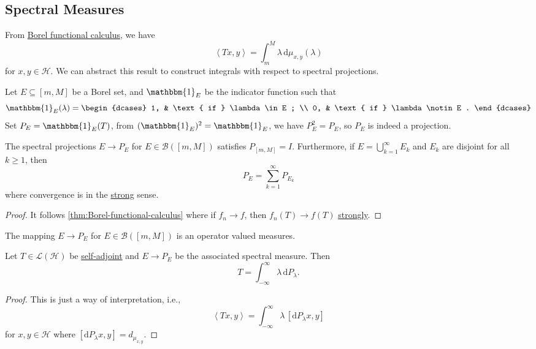 \subsection{Spectral Measures}
From \hyperref[thm:Borel-functional-calculus]{Borel functional calculus}, we have
\[
	\left\langle Tx, y \right\rangle = \int_{m}^{M} \lambda  \,\mathrm{d}\mu _{x, y}(\lambda )
\]
for \(x, y\in \mathcal{H} \). We can abstract this result to construct integrals with respect to spectral projections.

Let \(E \subseteq [m, M]\) be a Borel set, and \(\mathbbm{1}_{E} \) be the indicator function such that
\[
	\mathbbm{1}_{E} (\lambda ) = \begin{dcases}
		1, & \text{ if } \lambda \in E ;    \\
		0, & \text{ if } \lambda \notin E .
	\end{dcases}
\]
Set \(P_E = \mathbbm{1}_{E}(T) \), from \((\mathbbm{1}_{E} )^2 = \mathbbm{1}_{E} \), we have \(P_E^2 = P_E\), so \(P_E\) is indeed a projection.

\begin{proposition}
	The spectral projections \(E \to P_E\) for \(E\in \mathcal{B} ([m, M])\) satisfies \(P_{[m, M]} = I\). Furthermore, if \(E = \bigcup_{k=1}^{\infty} E_k\) and \(E_k\) are disjoint for all \(k\geq 1\), then
	\[
		P_E = \sum_{k=1}^{\infty} P_{E_k}
	\]
	where convergence is in the \hyperref[def:strongly-convergence]{strong} sense.
\end{proposition}
\begin{proof}
	It follows \autoref{thm:Borel-functional-calculus} where if \(f_n \to f\), then \(f_n(T) \to f(T)\) \hyperref[def:strongly-convergence]{strongly}.
\end{proof}

\begin{remark}
	The mapping \(E \to P_E\) for \(E\in \mathcal{B} ([m, M])\) is an operator valued measures.
\end{remark}

\begin{theorem}\label{thm:spectral}
	Let \(T\in \mathcal{L} (\mathcal{H} )\) be \hyperref[def:self-adjoint-op]{self-adjoint} and \(E \to P_E\) be the associated spectral measure. Then
	\[
		T = \int_{-\infty}^{\infty} \lambda  \,\mathrm{d}P_\lambda.
	\]
\end{theorem}
\begin{proof}
	This is just a way of interpretation, i.e.,
	\[
		\left\langle Tx, y \right\rangle = \int_{-\infty}^{\infty} \lambda \, \left[\mathrm{d} P_\lambda x, y \right]
	\]
	for \(x, y\in \mathcal{H} \) where \(\left[ \mathrm{d} P_\lambda x, y \right] = d_{\mu _{x, y}}\).
\end{proof}

